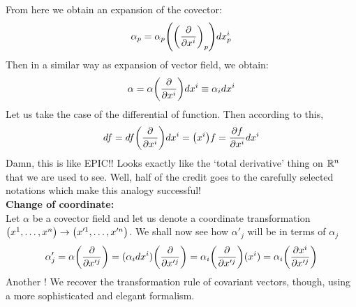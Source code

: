 From here we obtain an expansion of the covector:
$$\alpha_p = \alpha_p\qty(\qty(\pdv{x^i})_p) dx^i_p$$
Then in a similar way as expansion of vector field, we obtain:
$$\alpha = \alpha\qty(\pdv{x^i})dx^i \equiv \alpha_i dx^i$$
Let us take the case of the differential of function. Then according to this, 
$$df = df\qty(\pdv{x^i})dx^i = \qty(x^i)f = \pdv{f}{x^i}dx^i$$
Damn, this is like EPIC!!  Looks exactly like the `total derivative' thing on $\mathbb{R}^n$ that we are used to see. Well, half of the credit goes to the carefully selected notations which make this analogy successful!\\[0.2cm]
\textbf{Change of coordinate:}\\[0.2cm]
Let $\alpha$ be a covector field and let us denote a coordinate transformation $\qty(x^1,\ldots,x^n)\rightarrow \qty(x'^1,\ldots,x'^n)$. We shall now see how $\alpha'_j$ will be in terms of $\alpha_j$
$$\alpha_j' = \alpha\qty(\pdv{x'^j}) =( \alpha_i dx^i)\qty(\pdv{x'^j}) = \alpha_i \qty(\pdv{x'^j})(x^i) = \alpha_i \qty(\pdv{x^i}{x'^j}) $$
Another ! We recover the transformation rule of covariant vectors, though, using a more sophisticated and elegant formalism. 
